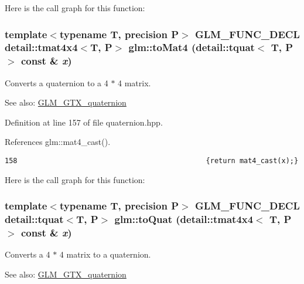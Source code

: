 Here is the call graph for this function:\hypertarget{group__gtx__quaternion_g79cbd9f8eecf24a7b9f23e4de5fcec29}{
\subsubsection[toMat4]{\setlength{\rightskip}{0pt plus 5cm}template$<$typename T, precision P$>$ GLM\_\-FUNC\_\-DECL detail::tmat4x4$<$T, P$>$ glm::toMat4 (detail::tquat$<$ T, P $>$ const \& {\em x})}}
\label{group__gtx__quaternion_g79cbd9f8eecf24a7b9f23e4de5fcec29}


Converts a quaternion to a 4 $\ast$ 4 matrix.

\begin{Desc}
\item[See also:]\hyperlink{group__gtx__quaternion}{GLM\_\-GTX\_\-quaternion} \end{Desc}


Definition at line 157 of file quaternion.hpp.

References glm::mat4\_\-cast().

\begin{Code}\begin{verbatim}158                                             {return mat4_cast(x);}
\end{verbatim}
\end{Code}




Here is the call graph for this function:\hypertarget{group__gtx__quaternion_g1d496c7c0d0b1a2edc5bb4c2ffcbc6e7}{
\subsubsection[toQuat]{\setlength{\rightskip}{0pt plus 5cm}template$<$typename T, precision P$>$ GLM\_\-FUNC\_\-DECL detail::tquat$<$T, P$>$ glm::toQuat (detail::tmat4x4$<$ T, P $>$ const \& {\em x})}}
\label{group__gtx__quaternion_g1d496c7c0d0b1a2edc5bb4c2ffcbc6e7}


Converts a 4 $\ast$ 4 matrix to a quaternion.

\begin{Desc}
\item[See also:]\hyperlink{group__gtx__quaternion}{GLM\_\-GTX\_\-quaternion} \end{Desc}


